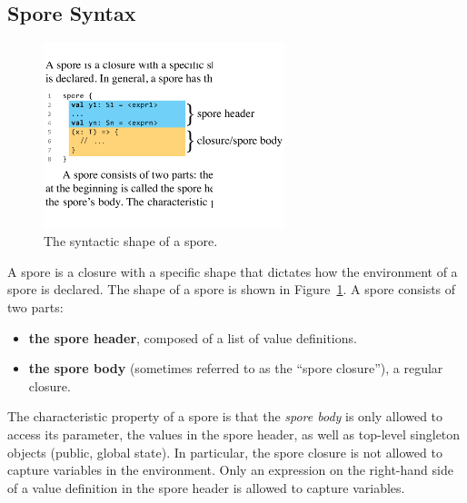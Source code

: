 \documentclass{llncs}
\begin{document}
\vspace{1mm}
\subsection{Spore Syntax}
\label{sec:spore-syntax}

\setlength{\belowcaptionskip}{-6pt}
\begin{figure}[t!]
\centering
\includegraphics[width=7cm]{spore-shape.pdf}
\vspace{-0.4cm}
\caption{The syntactic shape of a spore.}
\label{fig:spore-shape}
\end{figure}
\setlength{\belowcaptionskip}{0pt}

A spore is a closure with a specific shape that dictates how the environment
of a spore is declared. The shape of a spore is shown in Figure~\ref{fig:spore-shape}.
A spore consists of two parts:
\vspace{-1.5mm}
\begin{itemize}
\item {\bf the spore header}, composed of a list of value definitions.
\item {\bf the spore body} (sometimes referred to as the ``spore closure''), a regular closure.
\end{itemize}


The characteristic property
of a spore is that the {\em spore body} is only allowed to access its
parameter, the values in the spore header, as well as top-level singleton objects
(public, global state). In particular, the spore closure is not allowed to
capture variables in the environment. Only an expression on the right-hand
side of a value definition in the spore header is allowed to capture
variables.
\end{document}
